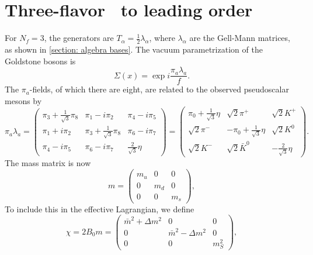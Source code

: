 \section{Three-flavor \chpt\ to leading order}
\label{section: three-flavor chpt to leading order}

For $N_f = 3$, the generators are $T_\alpha = \frac{1}{2} \lambda_\alpha$, where $\lambda_\alpha$ are the Gell-Mann matrices, as shown in \autoref{section: algebra bases}.
The vacuum parametrization of the Goldstone bosons is
%
\begin{equation}
    \Sigma(x) = \exp{i\frac{\pi_a \lambda_a}{f}}.
\end{equation}
%
The $\pi_a$-fields, of which there are eight, are related to the observed pseudoscalar mesons by~\autocite{schererIntroductionChiralPerturbation2002}
%
\begin{equation}
    \pi_a \lambda_a
    =
    \begin{pmatrix}
        \pi_3 + \frac{1}{\sqrt{3}} \pi_8 & \pi_1 - i \pi_2 & \pi_4 - i \pi_5 \\
        \pi_1 + i \pi_2 & \pi_3 + \frac{1}{\sqrt{3}} \pi_8 & \pi_6 - i \pi_7  \\
        \pi_4 - i \pi_5 & \pi_6 - i \pi_7  & \frac{2}{\sqrt{3}} \eta
    \end{pmatrix}
    =
    \begin{pmatrix}
        \pi_0 + \frac{1}{\sqrt{3}}\eta & \sqrt{2}\pi^+ & \sqrt{2}K^+ \\
        \sqrt{2}\pi^- & -\pi_0 + \frac{1}{\sqrt{3}}\eta & \sqrt{2}K^0 \\
        \sqrt{2}K^- & \sqrt{2}\bar K^0  & - \frac{2}{\sqrt 3} \eta
    \end{pmatrix}.
\end{equation}
%
The mass matrix is now
%
\begin{equation}
    m = 
    \begin{pmatrix}
        m_u & 0 & 0 \\
        0 & m_d & 0 \\
        0 & 0 & m_s
    \end{pmatrix},
\end{equation}
%
To include this in the effective Lagrangian, we define
%
\begin{equation}
    \chi = 2B_0 m = 
    \begin{pmatrix}
        \bar m^2 + \Delta m^2 & 0 &0\\
        0& \bar m^2 - \Delta m^2 & 0 \\
        0&0&m_S^2
    \end{pmatrix},
\end{equation}
